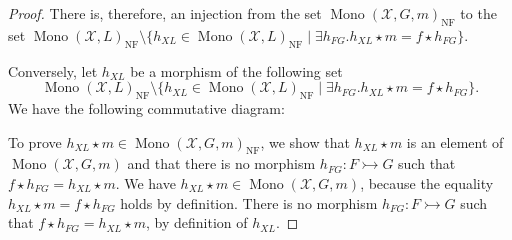 \begin{proof}
    There is, therefore, an injection from the set $\operatorname{Mono}(\mathcal{X},G,m)_{\operatorname{NF}}$ to the set $\operatorname{Mono}(\mathcal{X},L)_{\operatorname{NF}} \mathop{\setminus} \{
                h_{XL} \mathop{\in} \operatorname{Mono}(\mathcal{X},L)_{\operatorname{NF}} \mathop{\mid} 
                \exists h_{FG}. h_{XL} \mathop{\star} m \mathop{=} f \mathop{\star} h_{FG}
            \}$.

    Conversely, let $h_{XL}$ be a morphism of the following set $$\operatorname{Mono}(\mathcal{X},L)_{\operatorname{NF}}\mathop{\setminus} \{
                h_{XL} \mathop{\in} \operatorname{Mono}(\mathcal{X},L)_{\operatorname{NF}} \mathop{\mid} 
                \exists h_{FG}. h_{XL} \mathop{\star} m \mathop{=} f \mathop{\star} h_{FG}
            \}.$$ 
    We have the following commutative diagram:
    
    \begin{center}
    \end{center}
    To prove $h_{XL} \mathop{\star} m \mathop{\in} \operatorname{Mono}(\mathcal{X},G,m)_{\operatorname{NF}}$, we show that $h_{XL} \mathop{\star} m$ is an element of $\operatorname{Mono}(\mathcal{X},G,m)$ and that there is no morphism $h_{FG}: F \rightarrowtail G$ such that $f \mathop{\star} h_{FG} \mathop{=} h_{XL} \mathop{\star} m$. We have $h_{XL} \mathop{\star} m \mathop{\in} \operatorname{Mono}(\mathcal{X},G,m)$, because the equality $h_{XL} \mathop{\star} m \mathop{=} f \mathop{\star} h_{FG}$ holds by definition. There is no morphism $h_{FG}: F \rightarrowtail G$ such that $f \mathop{\star} h_{FG} \mathop{=} h_{XL} \mathop{\star} m$, by definition of $h_{XL}$.


\end{proof}
